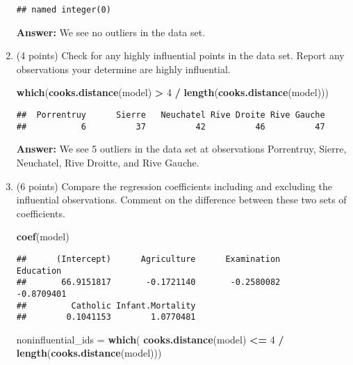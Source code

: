 \documentclass[
]{article}
\newenvironment{Shaded}{\begin{snugshade}}{\end{snugshade}}
\newcommand{\DecValTok}[1]{\textcolor[rgb]{0.00,0.00,0.81}{#1}}
\newcommand{\FunctionTok}[1]{\textcolor[rgb]{0.13,0.29,0.53}{\textbf{#1}}}
\newcommand{\NormalTok}[1]{#1}
\newcommand{\OtherTok}[1]{\textcolor[rgb]{0.56,0.35,0.01}{#1}}
\newcommand{\SpecialCharTok}[1]{\textcolor[rgb]{0.81,0.36,0.00}{\textbf{#1}}}
\begin{document}
\begin{enumerate}
\begin{verbatim}
## named integer(0)
\end{verbatim}

  \textbf{Answer:} We see no outliers in the data set.
\item
  (4 points) Check for any highly influential points in the data set.
  Report any observations your determine are highly influential.

\begin{Shaded}
\begin{Highlighting}[]
\FunctionTok{which}\NormalTok{(}\FunctionTok{cooks.distance}\NormalTok{(model) }\SpecialCharTok{\textgreater{}} \DecValTok{4} \SpecialCharTok{/} \FunctionTok{length}\NormalTok{(}\FunctionTok{cooks.distance}\NormalTok{(model)))}
\end{Highlighting}
\end{Shaded}

\begin{verbatim}
##  Porrentruy      Sierre   Neuchatel Rive Droite Rive Gauche 
##           6          37          42          46          47
\end{verbatim}

  \textbf{Answer:} We see 5 outliers in the data set at observations
  Porrentruy, Sierre, Neuchatel, Rive Droitte, and Rive Gauche.
\item
  (6 points) Compare the regression coefficients including and excluding
  the influential observations. Comment on the difference between these
  two sets of coefficients.

\begin{Shaded}
\begin{Highlighting}[]
\FunctionTok{coef}\NormalTok{(model)}
\end{Highlighting}
\end{Shaded}

\begin{verbatim}
##      (Intercept)      Agriculture      Examination        Education 
##       66.9151817       -0.1721140       -0.2580082       -0.8709401 
##         Catholic Infant.Mortality 
##        0.1041153        1.0770481
\end{verbatim}

\begin{Shaded}
\begin{Highlighting}[]
\NormalTok{noninfluential\_ids }\OtherTok{=} \FunctionTok{which}\NormalTok{(}
    \FunctionTok{cooks.distance}\NormalTok{(model) }\SpecialCharTok{\textless{}=} \DecValTok{4} \SpecialCharTok{/} \FunctionTok{length}\NormalTok{(}\FunctionTok{cooks.distance}\NormalTok{(model)))}


\end{Highlighting}
\end{Shaded}
\end{enumerate}
\end{document}
